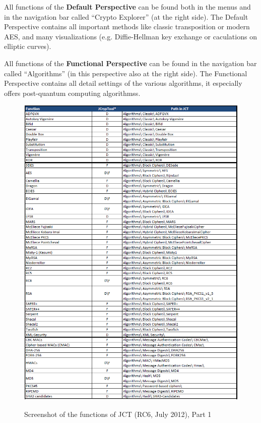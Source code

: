 All functions of the {\bf Default Perspective} can be found both in the menus and in the navigation bar called ``Crypto Explorer'' (at the right side).
The Default Perspective contains all important methods like classic transposition or modern AES, and many visualizations (e.g. Diffie-Hellman key exchange or caculations on elliptic curves).

All functions of the {\bf Functional Perspective} can be found in the navigation bar called ``Algorithms'' (in this perspective also at the right side).
The Functional Perspective contains all detail settings of the various algorithms, it especially offers post-quantum computing algorithmss.

\clearpage
\begin{figure}[hb]
\begin{center}
\vspace{-30pt}
\includegraphics[scale=0.8, angle=0] {figures/JCT-functions-en-1}
\hypertarget{functions-overview-1-JCT}{}
\caption{Screenshot of the functions of JCT (RC6, July 2012), Part 1} 
\label{functions-overview-1-JCT}
\end{center}
\end{figure}
\clearpage

